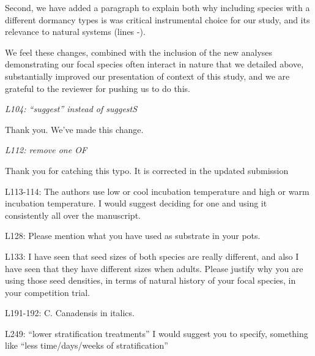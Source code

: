 \documentclass[11pt]{article}
\begin{document}
Second, we have added a paragraph to explain both why including species with a different dormancy types is was critical instrumental choice for our study, and its relevance to natural systems (lines -).

We feel these changes, combined with the inclusion of the new analyses demonstrating our focal species often interact in nature that we detailed above, substantially improved our presentation of context of this study, and we are grateful to the reviewer for pushing us to do this.

\emph{L104: “suggest” instead of suggestS}

Thank you. We've made this change.

\emph{L112: remove one OF}

Thank you for catching this typo. It is corrected in the updated submission

L113-114: The authors use low or cool incubation temperature and high or warm incubation temperature. I would suggest deciding for one and using it consistently all over the manuscript.

L128: Please mention what you have used as substrate in your pots.

L133: I have seen that seed sizes of both species are really different, and also I have seen that they have different sizes when adults. Please justify why you are using those seed densities, in terms of natural history of your focal species, in your competition trial.

L191-192: C. Canadensis in italics.

L249: “lower stratification treatments” I would suggest you to specify, something like “less time/days/weeks of stratification”
\end{document}
